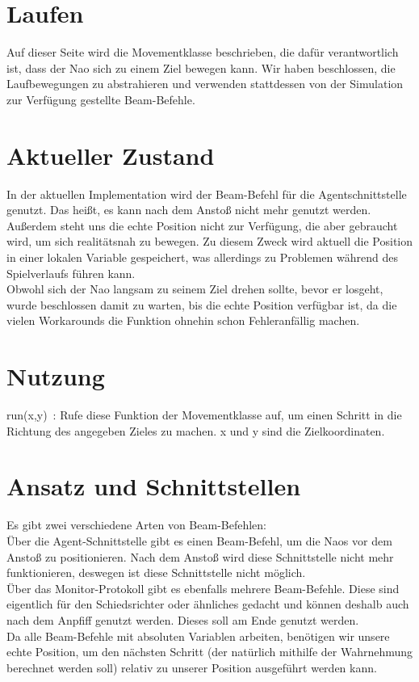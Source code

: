 \section{Laufen}
Auf dieser Seite wird die Movementklasse beschrieben, die dafür 
verantwortlich ist, dass der Nao sich zu einem Ziel bewegen kann. Wir 
haben beschlossen, die Laufbewegungen zu abstrahieren und verwenden 
stattdessen von der Simulation zur Verfügung gestellte Beam-Befehle.

\section{Aktueller Zustand}
In der aktuellen Implementation wird der Beam-Befehl für die 
Agentschnittstelle genutzt. Das heißt, es kann nach dem Anstoß nicht mehr genutzt werden. Außerdem steht uns die echte Position nicht zur 
Verfügung, die aber gebraucht wird, um sich realitätsnah zu bewegen. Zu 
diesem Zweck wird aktuell die Position in einer lokalen Variable 
gespeichert, was allerdings zu Problemen während des Spielverlaufs 
führen kann.\\
Obwohl sich der Nao langsam zu seinem Ziel drehen sollte, bevor er
 losgeht, wurde beschlossen damit zu warten, bis die echte Position 
verfügbar ist, da die vielen Workarounds die Funktion ohnehin schon 
Fehleranfällig machen. 

\section{Nutzung}
run(x,y)~: Rufe diese Funktion der Movementklasse auf, um einen 
Schritt in die Richtung des angegeben Zieles zu machen. x und y sind die
 Zielkoordinaten.

\section{Ansatz und Schnittstellen}
Es gibt zwei verschiedene Arten von Beam-Befehlen: \\
Über die Agent-Schnittstelle gibt es einen Beam-Befehl, um die 
Naos vor dem Anstoß zu positionieren. Nach dem Anstoß wird diese 
Schnittstelle nicht mehr funktionieren, deswegen ist diese Schnittstelle 
nicht möglich.\\
Über das Monitor-Protokoll gibt es ebenfalls mehrere 
Beam-Befehle. Diese sind eigentlich für den Schiedsrichter oder 
ähnliches gedacht und können deshalb auch nach dem Anpfiff genutzt 
werden. Dieses soll am Ende genutzt werden.\\
Da alle Beam-Befehle mit absoluten Variablen arbeiten, benötigen 
wir unsere echte Position, um den nächsten Schritt (der natürlich 
mithilfe der Wahrnehmung berechnet werden soll) relativ zu unserer 
Position ausgeführt werden kann.

